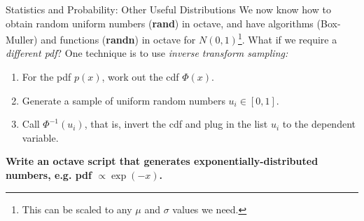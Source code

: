 \documentclass{beamer}
\begin{document}
\begin{frame}[fragile]{Statistics and Probability: Other Useful Distributions}
\small
We now know how to obtain random uniform numbers (\textbf{rand}) in octave, and have algorithms (Box-Muller) and functions (\textbf{randn}) in octave for $N(0,1)$\footnote{This can be scaled to any $\mu$ and $\sigma$ values we need.}.  What if we require a \textit{different pdf}?  One technique is to use \textit{inverse transform sampling:}
\begin{enumerate}
\item For the pdf $p(x)$, work out the cdf $\Phi(x)$.
\item Generate a sample of uniform random numbers $u_i \in [0,1]$.
\item Call $\Phi^{-1}(u_i)$, that is, invert the cdf and plug in the list $u_i$ to the dependent variable.
\end{enumerate}
\textbf{Write an octave script that generates exponentially-distributed numbers, e.g. pdf $\propto \exp(-x)$.}
\end{frame}
\end{document}
